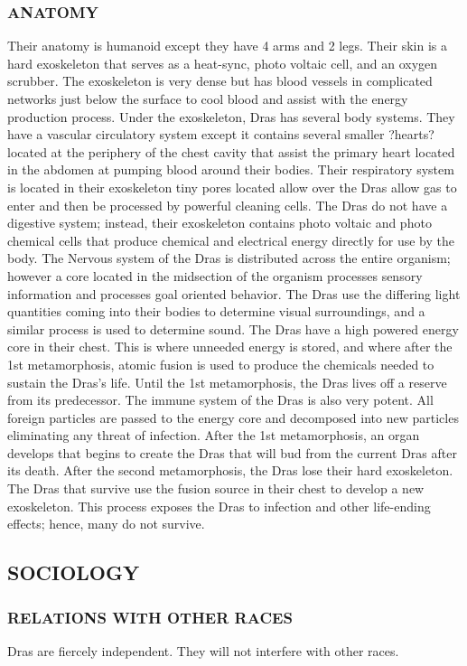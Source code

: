 \subsubsection{ANATOMY}
Their anatomy is humanoid except they have 4 arms and 2 legs.  Their skin is a
hard exoskeleton that serves as a heat-sync, photo voltaic cell, and an oxygen
scrubber.  The exoskeleton is very dense but has blood vessels in complicated
networks just below the surface to cool blood and assist with the energy
production process. Under the exoskeleton, Dras has several body systems. They
have a vascular circulatory system except it contains several smaller ?hearts?
located at the periphery of the chest cavity that assist the primary heart
located in the abdomen at pumping blood around their bodies.  Their respiratory
system is located in their exoskeleton tiny pores located allow over the Dras
allow gas to enter and then be processed by powerful cleaning cells.  The Dras
do not have a digestive system; instead, their exoskeleton contains photo
voltaic and photo chemical cells that produce chemical and electrical energy
directly for use by the body.  The Nervous system of the Dras is distributed
across the entire organism; however a core located in the midsection of the
organism processes sensory information and processes goal oriented behavior.
The Dras use the differing light quantities coming into their bodies to
determine visual surroundings, and a similar process is used to determine
sound.  The Dras have a high powered energy core in their chest.  This is where
unneeded energy is stored, and where after the 1st metamorphosis, atomic fusion
is used to produce the chemicals needed to sustain the Dras's life.  Until the
1st metamorphosis, the Dras lives off a reserve from its predecessor.  The
immune system of the Dras is also very potent.  All foreign particles are
passed to the energy core and decomposed into new particles eliminating any
threat of infection.  After the 1st metamorphosis, an organ develops that
begins to create the Dras that will bud from the current Dras after its death.
After the second metamorphosis, the Dras lose their hard exoskeleton.  The Dras
that survive use the fusion source in their chest to develop a new exoskeleton.
This process exposes the Dras to infection and other life-ending effects;
hence, many do not survive.
\subsection{SOCIOLOGY}
\subsubsection{RELATIONS WITH OTHER RACES}
Dras are fiercely independent.  They will not interfere with other races.
